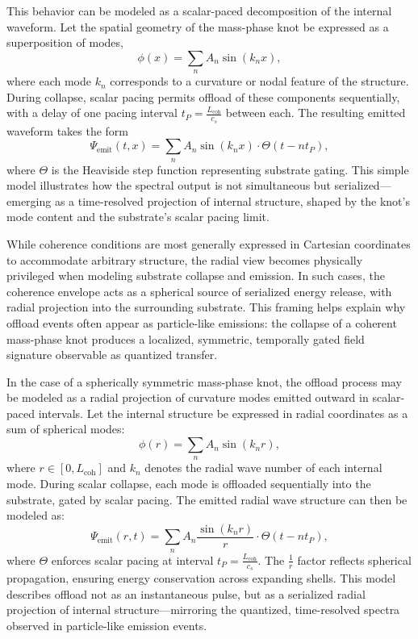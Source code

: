 \documentclass[entropy,article,submit,pdftex,moreauthors]{Definitions/mdpi}
\begin{document}
This behavior can be modeled as a scalar-paced decomposition of the internal waveform. Let the spatial geometry of the mass-phase knot be expressed as a superposition of modes,
\[
\phi(x) = \sum_n A_n \sin(k_n x),
\]
where each mode \( k_n \) corresponds to a curvature or nodal feature of the structure. During collapse, scalar pacing permits offload of these components sequentially, with a delay of one pacing interval \( t_P = \frac{L_{\text{coh}}}{c_s} \) between each. The resulting emitted waveform takes the form
\[
\Psi_{\text{emit}}(t, x) = \sum_n A_n \sin(k_n x) \cdot \Theta(t - n t_P),
\]
where \( \Theta \) is the Heaviside step function representing substrate gating. This simple model illustrates how the spectral output is not simultaneous but serialized—emerging as a time-resolved projection of internal structure, shaped by the knot’s mode content and the substrate’s scalar pacing limit.

While coherence conditions are most generally expressed in Cartesian coordinates to accommodate arbitrary structure, the radial view becomes physically privileged when modeling substrate collapse and emission. In such cases, the coherence envelope acts as a spherical source of serialized energy release, with radial projection into the surrounding substrate. This framing helps explain why offload events often appear as particle-like emissions: the collapse of a coherent mass-phase knot produces a localized, symmetric, temporally gated field signature observable as quantized transfer.

In the case of a spherically symmetric mass-phase knot, the offload process may be modeled as a radial projection of curvature modes emitted outward in scalar-paced intervals. Let the internal structure be expressed in radial coordinates as a sum of spherical modes:
\[
\phi(r) = \sum_n A_n \sin(k_n r),
\]
where \( r \in [0, L_{\text{coh}}] \) and \( k_n \) denotes the radial wave number of each internal mode. During scalar collapse, each mode is offloaded sequentially into the substrate, gated by scalar pacing. The emitted radial wave structure can then be modeled as:
\[
\Psi_{\text{emit}}(r, t) = \sum_n A_n \frac{\sin(k_n r)}{r} \cdot \Theta(t - n t_P),
\]
where \( \Theta \) enforces scalar pacing at interval \( t_P = \frac{L_{\text{coh}}}{c_s} \). The \( \frac{1}{r} \) factor reflects spherical propagation, ensuring energy conservation across expanding shells. This model describes offload not as an instantaneous pulse, but as a serialized radial projection of internal structure—mirroring the quantized, time-resolved spectra observed in particle-like emission events.
\end{document}
